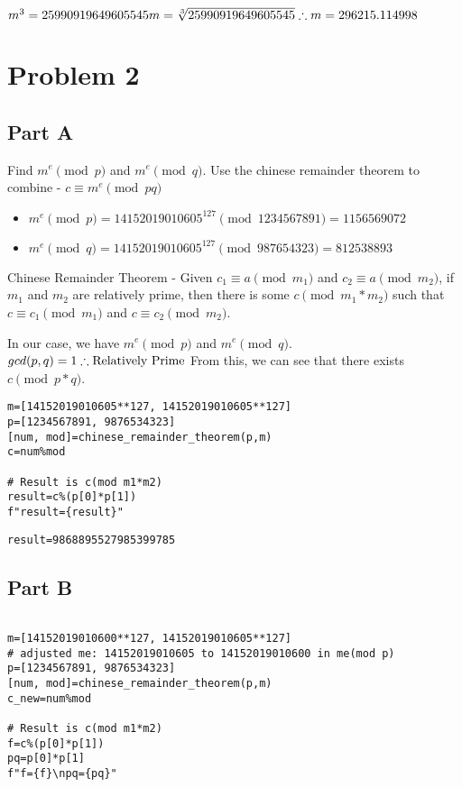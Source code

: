 \documentclass[11pt]{article}
\begin{document}
\(\\m^3=25990919649605545\\m=\sqrt[3]{25990919649605545}\\\therefore m=296215.114998\)

\section{Problem 2}
\label{sec:orge9ba7a0}

\subsection{Part A}
\label{sec:orgea0f3c9}
Find \(m^e\pmod{p}\) and \(m^e\pmod{q}\).
Use the chinese remainder theorem to combine - \(c\equiv m^e\pmod{pq}\)
\begin{itemize}
\item \(m^e\pmod{p}=14152019010605^{127}\pmod{1234567891}=1156569072\)
\item \(m^e\pmod{q}=14152019010605^{127}\pmod{987654323}=812538893\)
\end{itemize}


Chinese Remainder Theorem - Given \(c_1\equiv a\pmod{m_1}\) and \(c_2\equiv a\pmod{m_2}\), if \(m_1\) and \(m_2\) are relatively prime, then there is some \(c\pmod{m_1*m_2}\) such that \(c\equiv c_1\pmod{m_1}\) and \(c\equiv c_2\pmod{m_2}\).


In our case, we have \(m^e\pmod{p}\) and \(m^e\pmod{q}\).
\(\\gcd(p,q)=1\therefore\text{Relatively Prime}\\\)
From this, we can see that there exists \(c\pmod{p*q}\).
\begin{verbatim}
m=[14152019010605**127, 14152019010605**127]
p=[1234567891, 9876534323]
[num, mod]=chinese_remainder_theorem(p,m)
c=num%mod

# Result is c(mod m1*m2)
result=c%(p[0]*p[1])
f"result={result}"

\end{verbatim}

\begin{verbatim}
result=9868895527985399785
\end{verbatim}

\subsection{Part B}
\label{sec:org7620b4c}


\begin{verbatim}

m=[14152019010600**127, 14152019010605**127]
# adjusted me: 14152019010605 to 14152019010600 in me(mod p)
p=[1234567891, 9876534323]
[num, mod]=chinese_remainder_theorem(p,m)
c_new=num%mod

# Result is c(mod m1*m2)
f=c%(p[0]*p[1])
pq=p[0]*p[1]
f"f={f}\npq={pq}"

\end{verbatim}
\end{document}
